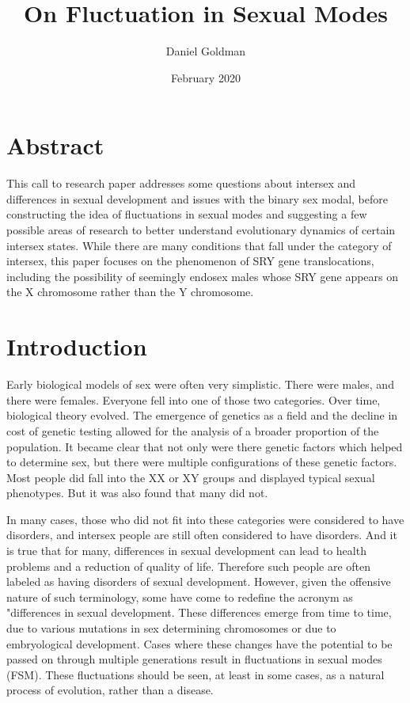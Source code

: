 \documentclass{article}
\title{On Fluctuation in Sexual Modes}
\author{Daniel Goldman}
\date{February 2020}
\begin{document}
\maketitle
\section{Abstract}
This call to research paper addresses some questions about intersex and differences in sexual development and issues with the binary sex modal, before constructing the idea of fluctuations in sexual modes and suggesting a few possible areas of research to better understand evolutionary dynamics of certain intersex states. While there are many conditions that fall under the category of intersex, this paper focuses on the phenomenon of SRY gene translocations, including the possibility of seemingly endosex males whose SRY gene appears on the X chromosome rather than the Y chromosome. 
\section{Introduction}
Early biological models of sex were often very simplistic. There were males, and there were females. Everyone fell into one of those two categories. Over time, biological theory evolved. The emergence of genetics as a field and the decline in cost of genetic testing allowed for the analysis of a broader proportion of the population. It became clear that not only were there genetic factors which helped to determine sex, but there were multiple configurations of these genetic factors. Most people did fall into the XX or XY groups and displayed typical sexual phenotypes. But it was also found that many did not. 

In many cases, those who did not fit into these categories were considered to have disorders, and intersex people are still often considered to have disorders. And it is true that for many, differences in sexual development can lead to health problems and a reduction of quality of life. Therefore such people are often labeled as having disorders of sexual development. However, given the offensive nature of such terminology, some have come to redefine the acronym as "differences in sexual development. These differences emerge from time to time, due to various mutations in sex determining chromosomes or due to embryological development. Cases where these changes have the potential to be passed on through multiple generations result in fluctuations in sexual modes (FSM). These fluctuations should be seen, at least in some cases, as a natural process of evolution, rather than a disease.  
\end{document}
